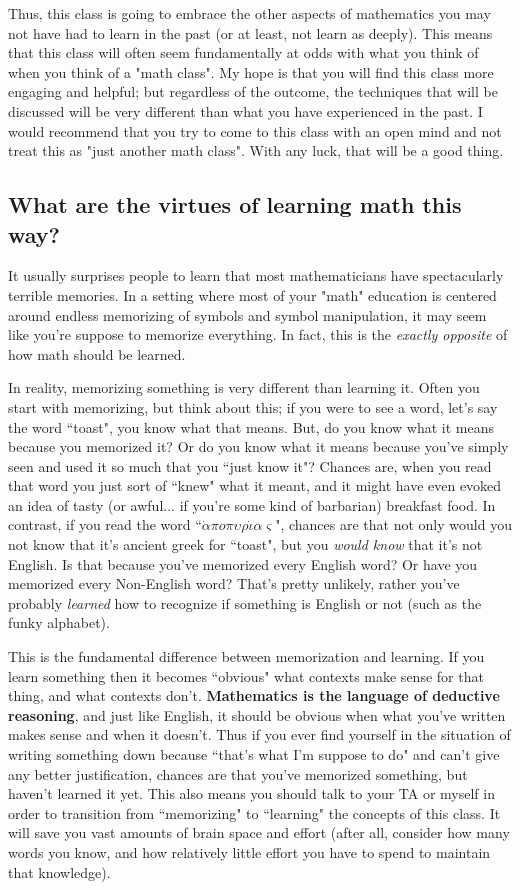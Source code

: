 Thus, this class is going to embrace the other aspects of mathematics you may not have had to learn in the past (or at least, not learn as deeply). This means that this class will often seem fundamentally at odds with what you think of when you think of a "math class". My hope is that you will find this class more engaging and helpful; but regardless of the outcome, the techniques that will be discussed will be very different than what you have experienced in the past. I would recommend that you try to come to this class with an open mind and not treat this as "just another math class". With any luck, that will be a good thing.

\subsection{What are the virtues of learning math this way?}
It usually surprises people to learn that most mathematicians have spectacularly terrible memories. In a setting where most of your "math" education is centered around endless memorizing of symbols and symbol manipulation, it may seem like you're suppose to memorize everything. In fact, this is the \textit{exactly opposite} of how math should be learned.

In reality, memorizing something is very different than learning it. Often you start with memorizing, but think about this; if you were to see a word, let's say the word ``toast", you know what that means. But, do you know what it means because you memorized it? Or do you know what it means because you've simply seen and used it so much that you ``just know it"? Chances are, when you read that word you just sort of ``knew" what it meant, and it might have even evoked an idea of tasty (or awful... if you're some kind of barbarian) breakfast food. In contrast, if you read the word ``$\dot{\alpha}\pi o \pi\upsilon\rho\dot{\iota}\alpha\varsigma$", chances are that not only would you not know that it's ancient greek for ``toast", but you \textit{would know} that it's not English. Is that because you've memorized every English word? Or have you memorized every Non-English word? That's pretty unlikely, rather you've probably \textit{learned} how to recognize if something is English or not (such as the funky alphabet).

This is the fundamental difference between memorization and learning. If you learn something then it becomes ``obvious" what contexts make sense for that thing, and what contexts don't. \textbf{Mathematics is the language of deductive reasoning}, and just like English, it should be obvious when what you've written makes sense and when it doesn't. Thus if you ever find yourself in the situation of writing something down because ``that's what I'm suppose to do" and can't give any better justification, chances are that you've memorized something, but haven't learned it yet. This also means you should talk to your TA or myself in order to transition from ``memorizing" to ``learning" the concepts of this class. It will save you vast amounts of brain space and effort (after all, consider how many words you know, and how relatively little effort you have to spend to maintain that knowledge).


